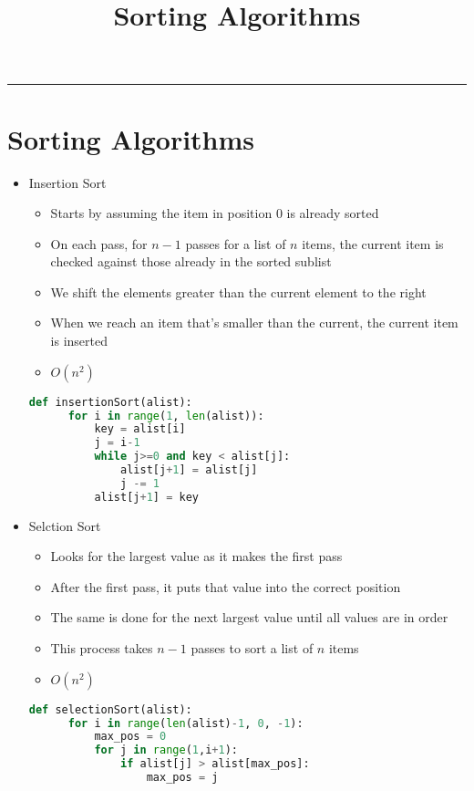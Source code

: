 \documentclass{article}
\title{Sorting Algorithms}
\begin{document}
\maketitle

\begin{center}
  \rule{0.5\textwidth}{0.4pt}
\end{center}

\section{Sorting Algorithms}
\begin{itemize}
  \item{Insertion Sort}
  \begin{itemize}
    \item{Starts by assuming the item in position 0 is already sorted}
    \item{On each pass, for $n-1$ passes for a list of $n$ items, the current item is checked against those already in the sorted sublist}
    \item{We shift the elements greater than the current element to the right}
    \item{When we reach an item that's smaller than the current, the current item is inserted}
    \item{$O(n^2)$}
  \end{itemize}
  \begin{lstlisting}[language=Python, frame=single]
  def insertionSort(alist):
      for i in range(1, len(alist)):
          key = alist[i]
          j = i-1
          while j>=0 and key < alist[j]:
              alist[j+1] = alist[j]
              j -= 1
          alist[j+1] = key
  \end{lstlisting}
  \pagebreak
  \item{Selction Sort}
  \begin{itemize}
    \item{Looks for the largest value as it makes the first pass}
    \item{After the first pass, it puts that value into the correct position}
    \item{The same is done for the next largest value until all values are in order}
    \item{This process takes $n-1$ passes to sort a list of $n$ items}
    \item{$O(n^2)$}
  \end{itemize}
  \begin{lstlisting}[language=Python, frame=single]
  def selectionSort(alist):
      for i in range(len(alist)-1, 0, -1):
          max_pos = 0
          for j in range(1,i+1):
              if alist[j] > alist[max_pos]:
                  max_pos = j


\end{lstlisting}
\end{itemize}
\end{document}
